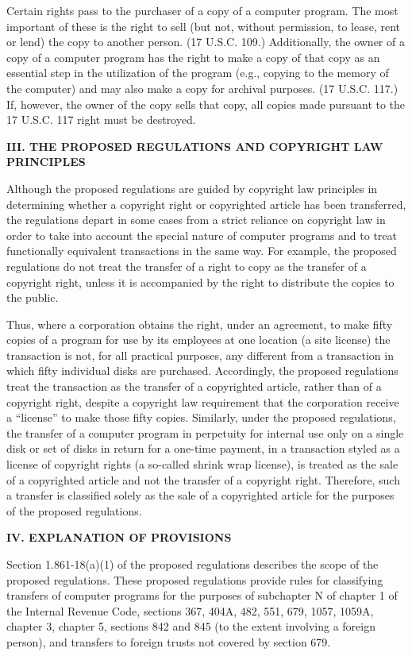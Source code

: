\begin{select}
Certain rights pass to the purchaser of a copy of a computer program. The most important of these is the right to sell (but not, without permission, to lease, rent or lend) the copy to another person. (17 U.S.C. 109.) Additionally, the owner of a copy of a computer program has the right to make a copy of that copy as an essential step in the utilization of the program (e.g., copying to the memory of the computer) and may also make a copy for archival purposes. (17 U.S.C. 117.) If, however, the owner of the copy sells that copy, all copies made pursuant to the 17 U.S.C. 117 right must be destroyed.

\begin{center} \textbf{III. THE PROPOSED REGULATIONS AND COPYRIGHT LAW PRINCIPLES}
\end{center}

Although the proposed regulations are guided by copyright law principles in determining whether a copyright right or copyrighted article has been transferred, the regulations depart in some cases from a strict reliance on copyright law in order to take into account the special nature of computer programs and to treat functionally equivalent transactions in the same way. For example, the proposed regulations do not treat the transfer of a right to copy as the transfer of a copyright right, unless it is accompanied by the right to distribute the copies to the public.

Thus, where a corporation obtains the right, under an agreement, to make fifty copies of a program for use by its employees at one location (a site license) the transaction is not, for all practical purposes, any different from a transaction in which fifty individual disks are purchased. Accordingly, the proposed regulations treat the transaction as the transfer of a copyrighted article, rather than of a copyright right, despite a copyright law requirement that the corporation receive a ``license'' to make those fifty copies. Similarly, under the proposed regulations, the transfer of a computer program in perpetuity for internal use only on a single disk or set of disks in return for a one-time payment, in a transaction styled as a license of copyright rights (a so-called shrink wrap license), is treated as the sale of a copyrighted article and not the transfer of a copyright right. Therefore, such a transfer is classified solely as the sale of a copyrighted article for the purposes of the proposed regulations.

\begin{center} \textbf{IV. EXPLANATION OF PROVISIONS}
\end{center}
Section 1.861-18(a)(1) of the proposed regulations describes the scope of the proposed regulations. These proposed regulations provide rules for classifying transfers of computer programs for the purposes of subchapter N of chapter 1 of the Internal Revenue Code, sections 367, 404A, 482, 551, 679, 1057, 1059A, chapter 3, chapter 5, sections 842 and 845 (to the extent involving a foreign person), and transfers to foreign trusts not covered by section 679.


\end{select}

